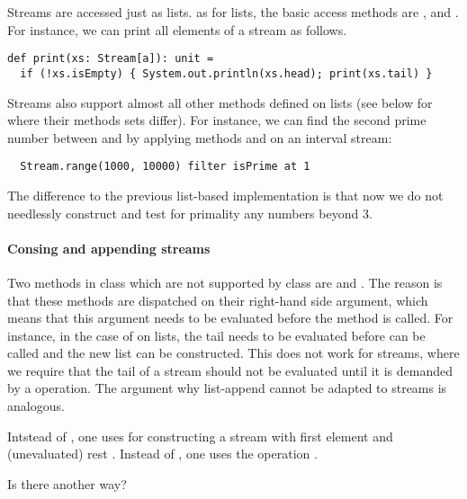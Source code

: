 \documentclass[a4paper,12pt,twoside,titlepage]{book}
\begin{document}
Streams are accessed just as lists. as for lists, the basic access
methods are ,  and . For instance,
we can print all elements of a stream as follows.
\begin{lstlisting}
def print(xs: Stream[a]): unit = 
  if (!xs.isEmpty) { System.out.println(xs.head); print(xs.tail) }
\end{lstlisting}
Streams also support almost all other methods defined on lists (see
below for where their methods sets differ). For instance, we can find
the second prime number between  and  by applying methods
 and  on an interval stream:
\begin{lstlisting}
  Stream.range(1000, 10000) filter isPrime at 1
\end{lstlisting}
The difference to the previous list-based implementation is that now
we do not needlessly construct and test for primality any numbers
beyond 3.

\paragraph{Consing and appending streams} Two methods in class 
which are not supported by class  are \code{::} and
\code{:::}.  The reason is that these methods are dispatched on their
right-hand side argument, which means that this argument needs to be
evaluated before the method is called. For instance, in the case of
 on lists, the tail  needs to be evaluated
before \code{::} can be called and the new list can be constructed.
This does not work for streams, where we require that the tail of a
stream should not be evaluated until it is demanded by a  operation.
The argument why list-append \code{:::} cannot be adapted to streams is analogous.

Intstead of , one uses  for
constructing a stream with first element  and (unevaluated)
rest .  Instead of , one uses the operation
.  

{Is there another way?}




\end{document}
